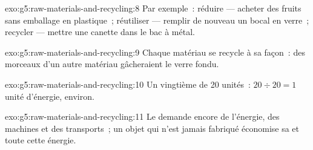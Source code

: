 \begin{solution}{exo:g5:raw-materials-and-recycling:8}
Par exemple~: réduire --- acheter des fruits sans emballage en
plastique~; réutiliser --- remplir de nouveau un bocal en verre~;
recycler --- mettre une canette dans le bac à métal.
\end{solution}

\begin{solution}{exo:g5:raw-materials-and-recycling:9}
Chaque matériau se recycle à sa façon~: des morceaux d'un autre
matériau gâcheraient le verre fondu.
\end{solution}

\begin{solution}{exo:g5:raw-materials-and-recycling:10}
Un vingtième de 20 unités~: $20 \div 20 = 1$ unité d'énergie, environ.
\end{solution}

\begin{solution}{exo:g5:raw-materials-and-recycling:11}
Le  demande encore de l'énergie, des machines et des
transports~; un objet qui n'est jamais fabriqué économise sa  et toute cette énergie.
\end{solution}
